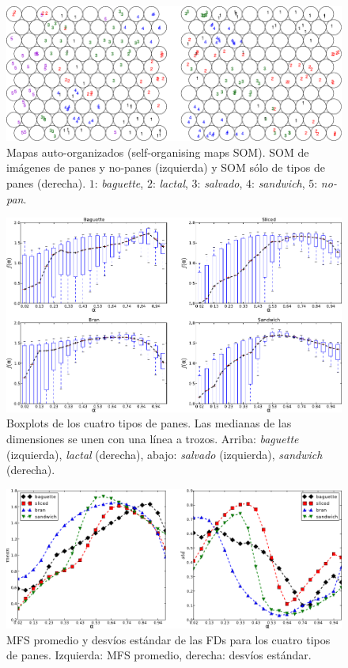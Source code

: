 \begin{figure}[h!]
\begin{centering}
\includegraphics[width=13cm]{SOM}
\caption[Mapas auto-organizados de imágenes de panes y otros objetos]{Mapas auto-organizados (self-organising maps SOM). SOM de imágenes de panes y no-panes (izquierda) y SOM sólo de tipos de panes (derecha). $1$: {\em baguette}, $2$: {\em lactal}, $3$: {\em salvado}, $4$: {\em sandwich}, $5$: {\em no-pan}.}
\label{fig:somfractal}
\end{centering}
\end{figure}

\begin{figure}[h!]
\centering
\includegraphics[width=13cm]{boxplots}
\caption[Boxplots de distintos tipos de panes]{Boxplots de los cuatro tipos de panes. Las medianas de las dimensiones se unen con una línea a trozos. Arriba: {\em baguette} (izquierda), {\em lactal} (derecha), abajo: {\em salvado} (izquierda), {\em sandwich} (derecha).}
\label{fig:boxplotsMFS}
\end{figure}

\begin{figure}[h!]
\centering
\includegraphics[width=13cm]{panstd}
\caption[MFS promedio y desvíos estándar de las FDs para los cuatro tipos de panes]{MFS promedio y desvíos estándar de las FDs para los cuatro tipos de panes. Izquierda: MFS promedio, derecha: desvíos estándar.}
\label{fig:meansMFS}
\end{figure}


